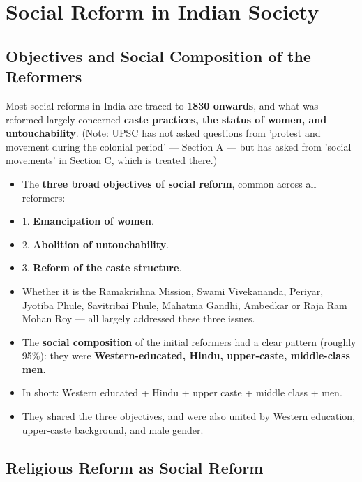 \chapter{Social Reform in Indian Society}

\section{Objectives and Social Composition of the Reformers}

Most social reforms in India are traced to \textbf{1830 onwards}, and what was reformed largely concerned \textbf{caste practices, the status of women, and untouchability}. (Note: UPSC has not asked questions from 'protest and movement during the colonial period' --- Section A --- but has asked from 'social movements' in Section C, which is treated there.)

\begin{KeyConcept}
\begin{itemize}
\item The \textbf{three broad objectives of social reform}, common across all reformers:
\item 1. \textbf{Emancipation of women}.
\item 2. \textbf{Abolition of untouchability}.
\item 3. \textbf{Reform of the caste structure}.
\item Whether it is the Ramakrishna Mission, Swami Vivekananda, Periyar, Jyotiba Phule, Savitribai Phule, Mahatma Gandhi, Ambedkar or Raja Ram Mohan Roy --- all largely addressed these three issues.
\end{itemize}
\end{KeyConcept}

\begin{KeyConcept}
\begin{itemize}
\item The \textbf{social composition} of the initial reformers had a clear pattern (roughly 95\%): they were \textbf{Western-educated, Hindu, upper-caste, middle-class men}.
\item In short: Western educated + Hindu + upper caste + middle class + men.
\item They shared the three objectives, and were also united by Western education, upper-caste background, and male gender.
\end{itemize}
\end{KeyConcept}

\section{Religious Reform as Social Reform}

